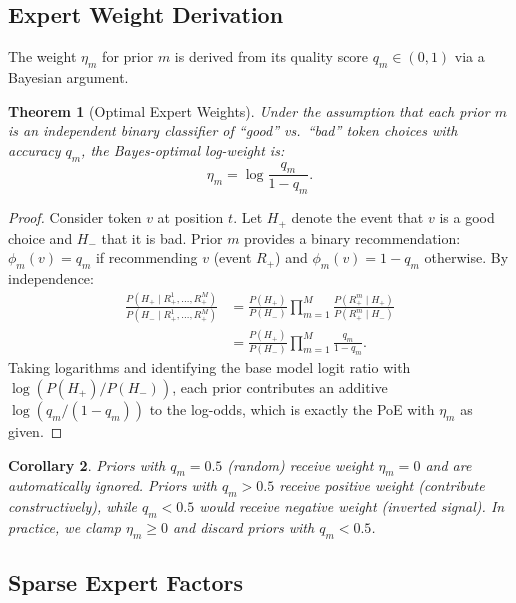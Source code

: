 \documentclass[11pt]{article}
\newtheorem{theorem}{Theorem}
\newtheorem{corollary}[theorem]{Corollary}
\begin{document}
\subsection{Expert Weight Derivation}

The weight $\eta_m$ for prior $m$ is derived from its quality score $q_m \in (0, 1)$
via a Bayesian argument.

\begin{theorem}[Optimal Expert Weights]
\label{thm:weights}
Under the assumption that each prior $m$ is an independent binary classifier of
``good'' vs.\ ``bad'' token choices with accuracy $q_m$, the Bayes-optimal
log-weight is:
\begin{equation}
    \eta_m = \log \frac{q_m}{1 - q_m}.
    \label{eq:eta-bayes}
\end{equation}
\end{theorem}

\begin{proof}
Consider token $v$ at position $t$. Let $H_+$ denote the event that $v$ is a
good choice and $H_-$ that it is bad. Prior $m$ provides a binary
recommendation: $\phi_m(v) = q_m$ if recommending $v$ (event $R_+$) and
$\phi_m(v) = 1 - q_m$ otherwise. By independence:
\begin{align}
    \frac{P(H_+ \mid R_+^1, \ldots, R_+^M)}{P(H_- \mid R_+^1, \ldots, R_+^M)}
    &= \frac{P(H_+)}{P(H_-)} \prod_{m=1}^M \frac{P(R_+^m \mid H_+)}{P(R_+^m \mid H_-)} \\
    &= \frac{P(H_+)}{P(H_-)} \prod_{m=1}^M \frac{q_m}{1 - q_m}.
\end{align}
Taking logarithms and identifying the base model logit ratio with
$\log(P(H_+)/P(H_-))$, each prior contributes an additive
$\log(q_m / (1 - q_m))$ to the log-odds, which is exactly the PoE with
$\eta_m$ as given.
\end{proof}

\begin{corollary}
Priors with $q_m = 0.5$ (random) receive weight $\eta_m = 0$ and are
automatically ignored. Priors with $q_m > 0.5$ receive positive weight
(contribute constructively), while $q_m < 0.5$ would receive negative weight
(inverted signal). In practice, we clamp $\eta_m \geq 0$ and discard priors
with $q_m < 0.5$.
\end{corollary}

\subsection{Sparse Expert Factors}
\end{document}

